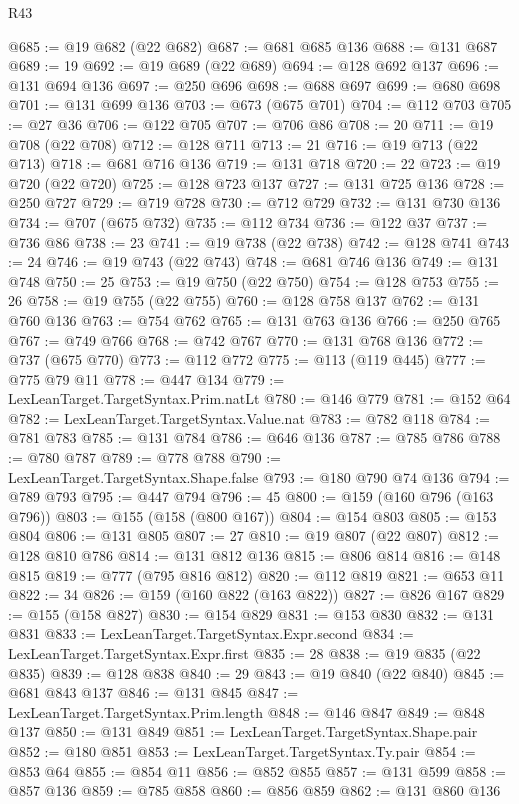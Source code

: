 \begin{lexlean}{R43}
\begin{coremodule}
@685 := @19 @682 (@22 @682)
@687 := @681 @685 @136
@688 := @131 @687
@689 := 19
@692 := @19 @689 (@22 @689)
@694 := @128 @692 @137
@696 := @131 @694 @136
@697 := @250 @696
@698 := @688 @697
@699 := @680 @698
@701 := @131 @699 @136
@703 := @673 (@675 @701)
@704 := @112 @703
@705 := @27 @36
@706 := @122 @705
@707 := @706 @86
@708 := 20
@711 := @19 @708 (@22 @708)
@712 := @128 @711
@713 := 21
@716 := @19 @713 (@22 @713)
@718 := @681 @716 @136
@719 := @131 @718
@720 := 22
@723 := @19 @720 (@22 @720)
@725 := @128 @723 @137
@727 := @131 @725 @136
@728 := @250 @727
@729 := @719 @728
@730 := @712 @729
@732 := @131 @730 @136
@734 := @707 (@675 @732)
@735 := @112 @734
@736 := @122 @37
@737 := @736 @86
@738 := 23
@741 := @19 @738 (@22 @738)
@742 := @128 @741
@743 := 24
@746 := @19 @743 (@22 @743)
@748 := @681 @746 @136
@749 := @131 @748
@750 := 25
@753 := @19 @750 (@22 @750)
@754 := @128 @753
@755 := 26
@758 := @19 @755 (@22 @755)
@760 := @128 @758 @137
@762 := @131 @760 @136
@763 := @754 @762
@765 := @131 @763 @136
@766 := @250 @765
@767 := @749 @766
@768 := @742 @767
@770 := @131 @768 @136
@772 := @737 (@675 @770)
@773 := @112 @772
@775 := @113 (@119 @445)
@777 := @775 @79 @11
@778 := @447 @134
@779 := LexLeanTarget.TargetSyntax.Prim.natLt
@780 := @146 @779
@781 := @152 @64
@782 := LexLeanTarget.TargetSyntax.Value.nat
@783 := @782 @118
@784 := @781 @783
@785 := @131 @784
@786 := @646 @136
@787 := @785 @786
@788 := @780 @787
@789 := @778 @788
@790 := LexLeanTarget.TargetSyntax.Shape.false
@793 := @180 @790 @74 @136
@794 := @789 @793
@795 := @447 @794
@796 := 45
@800 := @159 (@160 @796 (@163 @796))
@803 := @155 (@158 (@800 @167))
@804 := @154 @803
@805 := @153 @804
@806 := @131 @805
@807 := 27
@810 := @19 @807 (@22 @807)
@812 := @128 @810 @786
@814 := @131 @812 @136
@815 := @806 @814
@816 := @148 @815
@819 := @777 (@795 @816 @812)
@820 := @112 @819
@821 := @653 @11
@822 := 34
@826 := @159 (@160 @822 (@163 @822))
@827 := @826 @167
@829 := @155 (@158 @827)
@830 := @154 @829
@831 := @153 @830
@832 := @131 @831
@833 := LexLeanTarget.TargetSyntax.Expr.second
@834 := LexLeanTarget.TargetSyntax.Expr.first
@835 := 28
@838 := @19 @835 (@22 @835)
@839 := @128 @838
@840 := 29
@843 := @19 @840 (@22 @840)
@845 := @681 @843 @137
@846 := @131 @845
@847 := LexLeanTarget.TargetSyntax.Prim.length
@848 := @146 @847
@849 := @848 @137
@850 := @131 @849
@851 := LexLeanTarget.TargetSyntax.Shape.pair
@852 := @180 @851
@853 := LexLeanTarget.TargetSyntax.Ty.pair
@854 := @853 @64
@855 := @854 @11
@856 := @852 @855
@857 := @131 @599
@858 := @857 @136
@859 := @785 @858
@860 := @856 @859
@862 := @131 @860 @136

\end{coremodule}
\end{lexlean}
